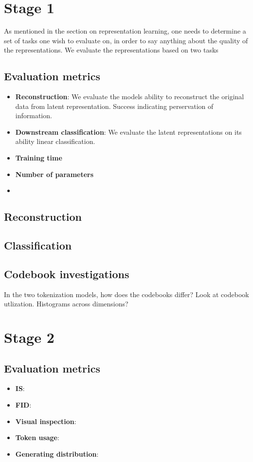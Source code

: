 \documentclass[../../thesis.tex]{subfiles}
\begin{document}
\section{Stage 1}

As mentioned in the section on representation learning, one needs to determine a set of tasks one wish to evaluate on, in order to say anything about the quality of the representations. We evaluate the representations based on two tasks

\subsection{Evaluation metrics}

\begin{itemize}
    \item \textbf{Reconstruction}: We evaluate the models ability to reconstruct the original data from latent representation. Success indicating perservation of information.
    \item \textbf{Downstream classification}: We evaluate the latent representations on its ability linear classification. 
    \item \textbf{Training time}
    \item \textbf{Number of parameters}
    \item 
\end{itemize}

\subsection{Reconstruction}

\subsection{Classification}

\subsection{Codebook investigations}

In the two tokenization models, how does the codebooks differ? Look at codebook utlization. Histograms across dimensions?  

\section{Stage 2}

\subsection{Evaluation metrics}
\begin{itemize}
    \item \textbf{IS}:
    \item \textbf{FID}:
    \item \textbf{Visual inspection}:
    \item \textbf{Token usage}:
    \item \textbf{Generating distribution}:
\end{itemize}
\end{document}
